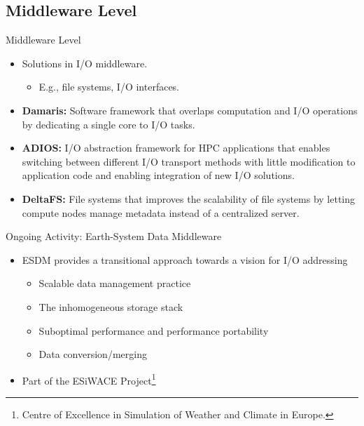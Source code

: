 \documentclass[compress,11pt,xcolor=svgnames,aspectratio=169]{beamer}
\begin{document}
\subsection{Middleware Level}

\begin{frame}[fragile]{Middleware Level}

\begin{itemize}
\setlength\itemsep{0.4cm}

\item Solutions in I/O middleware.

    \begin{itemize}

    \item E.g., file systems, I/O interfaces.

    \end{itemize}

\item \textbf{Damaris:} Software framework that overlaps computation and I/O operations by dedicating a single core to I/O tasks.

\item \textbf{ADIOS:} I/O abstraction framework for HPC applications that enables switching between different I/O transport methods with little modification to application code and enabling integration of new I/O solutions.

\item \textbf{DeltaFS:} File systems that improves the scalability of file systems by letting compute nodes manage metadata instead of a centralized server.

\end{itemize}

\nocite{3372390}

\end{frame}

\begin{frame}[fragile]{Ongoing Activity: Earth-System Data Middleware}

\begin{itemize}
\setlength\itemsep{0.4cm}

    \item ESDM provides a transitional approach towards a vision for I/O addressing\\[0.3cm]

    \begin{itemize}
    \setlength\itemsep{0.4cm}
    \item Scalable data management practice
    \item The inhomogeneous storage stack
    \item Suboptimal performance and performance portability
    \item Data conversion/merging

    \end{itemize}

    \item Part of the ESiWACE Project\footnote{Centre of Excellence in Simulation of Weather and Climate in Europe.}

\end{itemize}

\end{frame}
\end{document}
